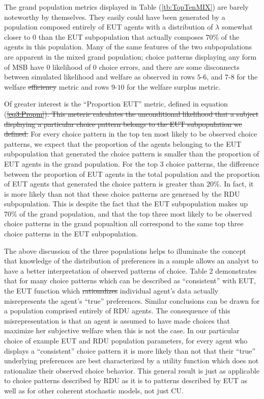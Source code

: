 \documentclass[11pt,a4paper]{article} %
\providecommand{\DIFaddtex}[1]{{\protect\color{blue}\uwave{#1}}} %
\providecommand{\DIFdeltex}[1]{{\protect\color{red}\sout{#1}}}                      %
\providecommand{\DIFaddbegin}{} %
\providecommand{\DIFaddend}{} %
\providecommand{\DIFdelbegin}{} %
\providecommand{\DIFdelend}{} %
\providecommand{\DIFadd}[1]{\texorpdfstring{\DIFaddtex{#1}}{#1}} %
\providecommand{\DIFdel}[1]{\texorpdfstring{\DIFdeltex{#1}}{}} %
\newcommand{\DIFscaledelfig}{0.5}
\newlength{\DIFdelgraphicswidth} %
\newlength{\DIFdelgraphicsheight} %
\newcommand{\DIFaddincludegraphics}[2][]{{\color{blue}\fbox{\DIFOincludegraphics[#1]{#2}}}} %
\newcommand{\DIFdelincludegraphics}[2][]{%
\sbox{\DIFdelgraphicsbox}{\DIFOincludegraphics[#1]{#2}}%
\settoboxwidth{\DIFdelgraphicswidth}{\DIFdelgraphicsbox} %
\settoboxtotalheight{\DIFdelgraphicsheight}{\DIFdelgraphicsbox} %
\scalebox{\DIFscaledelfig}{%
\parbox[b]{\DIFdelgraphicswidth}{\usebox{\DIFdelgraphicsbox}\\[-\baselineskip] \rule{\DIFdelgraphicswidth}{0em}}\llap{\resizebox{\DIFdelgraphicswidth}{\DIFdelgraphicsheight}{%
\setlength{\unitlength}{\DIFdelgraphicswidth}%
\begin{picture}(1,1)%
\thicklines\linethickness{2pt} %
{\color[rgb]{1,0,0}\put(0,0){\framebox(1,1){}}}%
{\color[rgb]{1,0,0}\put(0,0){\line( 1,1){1}}}%
{\color[rgb]{1,0,0}\put(0,1){\line(1,-1){1}}}%
\end{picture}%
}\hspace*{3pt}}} %
} %
\DeclareRobustCommand{\DIFaddbegin}{\DIFOaddbegin \let\includegraphics\DIFaddincludegraphics} %
\DeclareRobustCommand{\DIFaddend}{\DIFOaddend \let\includegraphics\DIFOincludegraphics} %
\DeclareRobustCommand{\DIFdelbegin}{\DIFOdelbegin \let\includegraphics\DIFdelincludegraphics} %
\DeclareRobustCommand{\DIFdelend}{\DIFOaddend \let\includegraphics\DIFOincludegraphics} %
\begin{document}
The grand population metrics displayed in Table (\ref{tb:TopTenMIX}) are barely noteworthy by themselves.
They easily could have been generated by a population composed entirely of EUT agents with a distribution of $\lambda$ somewhat closer to $0$ than the EUT subpopulation that actually composes $70\%$ of the agents in this population.
Many of the same features of the two subpopulations are apparent in the mixed grand population;
choice patterns displaying any form of MSB have $0$ likelihood of $0$ choice errors, and there are some disconnects between simulated likelihood and welfare as observed in rows $5$-$6$, and $7$-$8$ for the welfare \DIFdelbegin \DIFdel{efficiency }\DIFdelend \DIFaddbegin \DIFadd{proportion }\DIFaddend metric and rows $9$-$10$ for the welfare surplus metric.

Of greater interest is the \enquote{Proportion EUT} metric, defined in equation (\DIFdelbegin \DIFdel{\ref{eq3:Propm}).
This meteric calculates the unconditional likelihood that a subject displaying a particular choice pattern belongs to the EUT subpopulation we defined.
}\DIFdelend \DIFaddbegin \DIFadd{\ref{eq:Propm}).
}\DIFaddend For every choice pattern in the top ten most likely to be observed choice patterns, we expect that the proportion of the agents belonging to the EUT subpopulation that generated the choice pattern is smaller than the proportion of EUT agents in the grand population.
For the top 3 choice patterns, the difference between the proportion of EUT agents in the total population and the proportion of EUT agents that generated the choice pattern is greater than $20\%$.
In fact, it is more likely than not that these choice patterns are generaed by the RDU subpopulation.
This is despite the fact that the EUT subpopulation makes up $70\%$ of the grand population, and that the top three most likely to be observed choice patterns in the grand popualtion all correspond to the same top three choice patterns in the EUT subpopulation.

The above discussion of the three populations helps to illuminate the concept that knowledge of the distribution of preferences in a sample allows an analyst to have a better interpretation of observed patterns of choice.
Table 2 demonstrates that for many choice patterns which can be described as \enquote{consistent} with EUT, the EUT function which \DIFdelbegin \DIFdel{rationalizes }\DIFdelend \DIFaddbegin \DIFadd{would best fit the }\DIFaddend individual agent's data actually misrepresents the agent's \enquote{true} preferences.
Similar conclusions can be drawn for a population comprised entirely of RDU agents.
The consequence of this misrepresentation is that an agent is assumed to have made choices that maximize her subjective welfare when this is not the case.
In our particular choice of example EUT and RDU population parameters, for every agent who displays a \enquote{consistent} choice pattern it is more likely than not that their \enquote{true} underlying preferences are best characterized by a utility function which does not rationalize their observed choice behavior.
This general result is just as applicable to choice patterns described by RDU as it is to patterns described by EUT as well as for other coherent stochastic models, not just CU.
\end{document}
